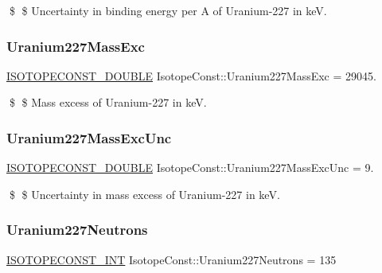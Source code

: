 \$ \$ Uncertainty in binding energy per A of Uranium-\/227 in keV. \mbox{\label{group___isotope_const-_uranium-_u227_gaf24f8c3a6021741b0d3d0ea7c4964bd7}} 
\subsubsection{\texorpdfstring{Uranium227\+Mass\+Exc}{Uranium227MassExc}}
{\footnotesize\ttfamily \mbox{\hyperlink{group___isotope_const-_macros_ga8f45a7272ce02c0b4c65c44636ed719a}{I\+S\+O\+T\+O\+P\+E\+C\+O\+N\+S\+T\+\_\+\+D\+O\+U\+B\+LE}} Isotope\+Const\+::\+Uranium227\+Mass\+Exc = 29045.}

\$ \$ Mass excess of Uranium-\/227 in keV. \mbox{\label{group___isotope_const-_uranium-_u227_ga3e45576a32956d591d93eb293745eafb}} 
\subsubsection{\texorpdfstring{Uranium227\+Mass\+Exc\+Unc}{Uranium227MassExcUnc}}
{\footnotesize\ttfamily \mbox{\hyperlink{group___isotope_const-_macros_ga8f45a7272ce02c0b4c65c44636ed719a}{I\+S\+O\+T\+O\+P\+E\+C\+O\+N\+S\+T\+\_\+\+D\+O\+U\+B\+LE}} Isotope\+Const\+::\+Uranium227\+Mass\+Exc\+Unc = 9.}

\$ \$ Uncertainty in mass excess of Uranium-\/227 in keV. \mbox{\label{group___isotope_const-_uranium-_u227_ga9b46afefd6bc67fe6a1e476a9cc0119a}} 
\subsubsection{\texorpdfstring{Uranium227\+Neutrons}{Uranium227Neutrons}}
{\footnotesize\ttfamily \mbox{\hyperlink{group___isotope_const-_macros_ga5f18360b3e99483a35c32d789e62621c}{I\+S\+O\+T\+O\+P\+E\+C\+O\+N\+S\+T\+\_\+\+I\+NT}} Isotope\+Const\+::\+Uranium227\+Neutrons = 135}

